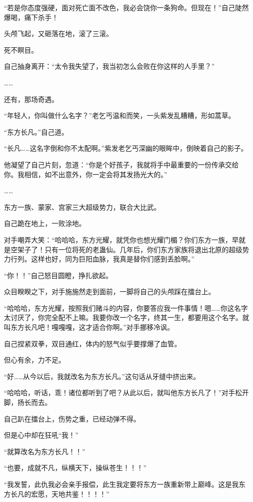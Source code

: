 \begin{this_body}
“若是你态度强硬，面对死亡面不改色，我必会饶你一条狗命。但现在！”自己陡然爆喝，痛下杀手！

头颅飞起，又砸落在地，滚了三滚。

死不瞑目。

自己抽身离开：“太令我失望了，我当初怎么会败在你这样的人手里？”

……

还有，那场奇遇。

“年轻人，你叫做什么名字？”老乞丐温和而笑，一头紫发乱糟糟，形如蒿草。

“东方长凡。”自己道。

“长凡……这名字倒和你不太配啊。”紫发老乞丐深幽的眼眸中，倒映着自己的影子。

他凝望了自己片刻，忽道：“你是个好孩子，我就将手中最重要的一份传承交给你。我相信，如不出意外，你一定会将其发扬光大的。”

……

东方一族、蒙家、宫家三大超级势力，联合大比武。

自己跪在地上，一败涂地。

对手嘲弄大笑：“哈哈哈，东方光耀，就凭你也想光耀门楣？你们东方一族，早就是空架子了！只有一位将死的老蛊仙。几年后，你们东方家族将退出北原的超级势力行列。这样也好，同为巨阳血脉，我真是替你们感到丢脸啊。”

“你！！”自己怒目圆瞪，挣扎欲起。

众目睽睽之下，对手施施然走到面前，一脚将自己的头颅踩在擂台上。

“哈哈哈，东方光耀，按照我们赌斗的内容，你要答应我一件事情！嗯……你这名字太讨厌了，你完全配不上嘛。我要你改一个名字，终其一生，都要用这个名字。就叫东方长凡吧！嘎嘎嘎，这才适合你啊。”对手挪移冷讽。

自己捏紧双拳，双目通红，体内的怒气似乎要撑爆了血管。

但心有余，力不足。

“好……从今以后，我就改名为东方长凡。”这句话从牙缝中挤出来。

“哈哈哈，听话，乖！诸位都听到了吧？从此以后，就叫他东方长凡了！”对手松开脚，扬长而去。

自己趴在擂台上，伤势之重，已经动弹不得。

但是心中却在狂吼“我！”

“就算改名为东方长凡！！”

“也要，成就不凡，纵横天下，操纵苍生！！！”

“我发誓，此仇我必会亲手报偿，此生我定要将东方一族重新带上巅峰。这是我东方长凡的宏愿，天地共鉴！！！！”


\end{this_body}
